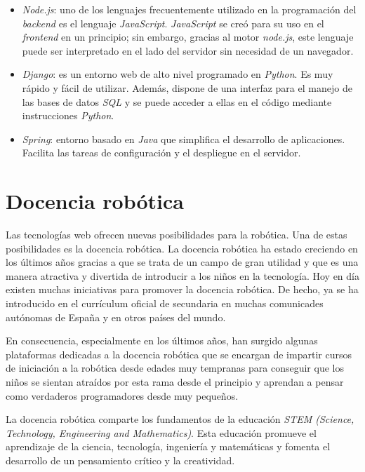 \begin{itemize}
    \item \textit{Node.js}: uno de los lenguajes frecuentemente utilizado en la programación del \textit{backend} es el lenguaje \textit{JavaScript}. \textit{JavaScript} se creó para su uso en el \textit{frontend} en un principio; sin embargo, gracias al motor \textit{node.js}, este lenguaje puede ser interpretado en el lado del servidor sin necesidad de un navegador.
    \item \textit{Django}: es un entorno web de alto nivel programado en \textit{Python}. Es muy rápido y fácil de utilizar. Además, dispone de una interfaz para el manejo de las bases de datos \textit{SQL} y se puede acceder a ellas en el código mediante instrucciones \textit{Python}.
    \item \textit{Spring}: entorno basado en \textit{Java} que simplifica el desarrollo de aplicaciones. Facilita las tareas de configuración y el despliegue en el servidor.
\end{itemize}


\section{Docencia robótica}
Las tecnologías web ofrecen nuevas posibilidades para la robótica. Una de estas posibilidades es la docencia robótica. La docencia robótica ha estado creciendo en los últimos años gracias a que se trata de un campo de gran utilidad y que es una manera atractiva y divertida de introducir a los niños en la tecnología. Hoy en día existen muchas iniciativas para promover la docencia robótica. De hecho, ya se ha introducido en el currículum oficial de secundaria en muchas comunicades autónomas de España y en otros países del mundo.  \newline

En consecuencia, especialmente en los últimos años, han surgido algunas plataformas dedicadas a la docencia robótica que se encargan de impartir cursos de iniciación a la robótica desde edades muy tempranas para conseguir que los niños se sientan atraídos por esta rama desde el principio y aprendan a pensar como verdaderos programadores desde muy pequeños. \newline

La docencia robótica comparte los fundamentos de la educación \textit{STEM (Science, Technology, Engineering and Mathematics)}. Esta educación promueve el aprendizaje de la ciencia, tecnología, ingeniería y matemáticas y fomenta el desarrollo de un pensamiento crítico y la creatividad. \newline

